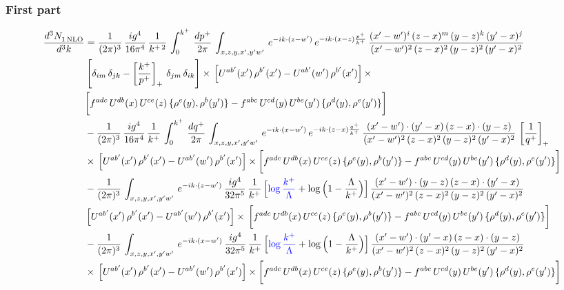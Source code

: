 \documentclass[9pt]{article}
\numberwithin{equation}{section}
\begin{document}
\subsubsection*{First part}
\begin{align}
     \frac{d^{3}N_{1\,\rm NLO}^{\rm}}{d^{3}k}  & = \frac{1}{(2\pi)^{3}}\, \frac{ig^{4}}{16\pi^{4}}\, \frac{1}{k^{+\,2}}\,\int_{0}^{k^{+}}\, \frac{dp^{+}}{2\pi}\,\int_{x,z,y,x',y'w'}\,e^{-ik\cdot (z-w^\prime)}\,e^{-ik\cdot (x-z)\frac{p^{+}}{k^{+}}}\,\frac{(x'-w')^{i}\,(z-x)^{m}\,(y-z)^{k}\,(y'-x)^{j}}{(x'-w')^{2}\,(z-x)^{2}\,(y-z)^{2}\,(y'-x)^{2}}\,\notag \\ & \left[\delta_{im}\,\delta_{jk}-\left[\frac{k^{+}}{p^{+}}\right]_{+}\, \delta_{jm}\,\delta_{ik}\right]\times\, \left[U^{ab'}(x')\,\rho^{b'}(x')-U^{ab'}(w')\,\rho^{b'}(x')\right]\times\notag \\ & \bigg[f^{adc}\,U^{db}(x)\,U^{ce}(z)\, \{\rho^{e}(y),\rho^{b}(y')\}-f^{abc}\,U^{cd}(y)\,U^{be}(y')\, \{\rho^{d}(y),\rho^{e}(y')\}\bigg]\notag \\ & -\frac{1}{(2\pi)^{3}}\, \frac{ig^{4}}{16\pi^{4}}\, \frac{1}{k^{+}}\,\int_{0}^{k^{+}}\, \frac{dq^{+}}{2\pi}\,\int_{x,z,y,x',y'w'}\,e^{-ik\cdot (x-w^\prime)}\,e^{-ik\cdot (z-x)\frac{q^{+}}{k^{+}}}\,\frac{(x'-w')\cdot (y'-x)\,(z-x)\cdot (y-z)}{(x'-w')^{2}\,(z-x)^{2}\,(y-z)^{2}\,(y'-x)^{2}}\,\left[\frac{1}{q^{+}}\right]_{+}\notag \\ & \times\, \left[U^{ab'}(x')\,\rho^{b'}(x')-U^{ab'}(w')\,\rho^{b'}(x')\right]\times \bigg[f^{adc}\,U^{db}(x)\,U^{ce}(z)\, \{\rho^{e}(y),\rho^{b}(y')\}-f^{abc}\,U^{cd}(y)\,U^{be}(y')\, \{\rho^{d}(y),\rho^{e}(y')\}\bigg]\notag \\ & -\frac{1}{(2\pi)^{3}}\, \int_{x,z,y,x',y'w'}\,e^{-ik\cdot (z-w^\prime)}\,\frac{ig^{4}}{32\pi^{5}}\, \frac{1}{k^{+}}\,\Big[{\color{blue}\log\frac{k^{+}}{\Lambda}}+\log\Big(1-\frac{\Lambda}{k^{+}}\Big)\Big]\,\frac{(x'-w')\cdot (y-z)\,(z-x)\cdot (y'-x)}{(x'-w')^{2}\,(z-x)^{2}\,(y-z)^{2}\,(y'-x)^{2}}\,\notag \\ & \left[U^{ab'}(x')\,\rho^{b'}(x')-U^{ab'}(w')\,\rho^{b'}(x')\right]\times\, \bigg[f^{adc}\,U^{db}(x)\,U^{ce}(z)\, \{\rho^{e}(y),\rho^{b}(y')\}-f^{abc}\,U^{cd}(y)\,U^{be}(y')\, \{\rho^{d}(y),\rho^{e}(y')\}\bigg]\notag \\ &  -\frac{1}{(2\pi)^{3}}\, \int_{x,z,y,x',y'w'}\,e^{-ik\cdot (x-w^\prime)}\,\frac{ig^{4}}{32\pi^{5}}\, \frac{1}{k^{+}}\,\Big[{\color{blue}\log\frac{k^{+}}{\Lambda}}+\log\Big(1-\frac{\Lambda}{k^{+}}\Big)\Big]\,\frac{(x'-w')\cdot (y'-x)\,(z-x)\cdot (y-z)}{(x'-w')^{2}\,(z-x)^{2}\,(y-z)^{2}\,(y'-x)^{2}}\notag \\ & \times\, \left[U^{ab'}(x')\,\rho^{b'}(x')-U^{ab'}(w')\,\rho^{b'}(x')\right]\times \bigg[f^{adc}\,U^{db}(x)\,U^{ce}(z)\, \{\rho^{e}(y),\rho^{b}(y')\}-f^{abc}\,U^{cd}(y)\,U^{be}(y')\, \{\rho^{d}(y),\rho^{e}(y')\}\bigg]
\end{align}
\end{document}
